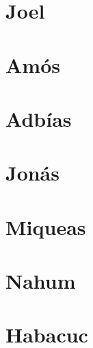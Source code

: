 \chapter{Joel}
\begin{multicols}{2}
  \parskip=0pt \relax
  
\end{multicols}

\chapter{Amós}
\begin{multicols}{2}
  \parskip=0pt \relax
  
\end{multicols}

\chapter{Adbías}
\begin{multicols}{2}
  \parskip=0pt \relax
  
\end{multicols}

\chapter{Jonás}
\begin{multicols}{2}
  \parskip=0pt \relax
  
\end{multicols}

\chapter{Miqueas}
\begin{multicols}{2}
  \parskip=0pt \relax
  
\end{multicols}

\chapter{Nahum}
\begin{multicols}{2}
  \parskip=0pt \relax
  
\end{multicols}

\chapter{Habacuc}
\begin{multicols}{2}
  \parskip=0pt \relax
  
\end{multicols}

